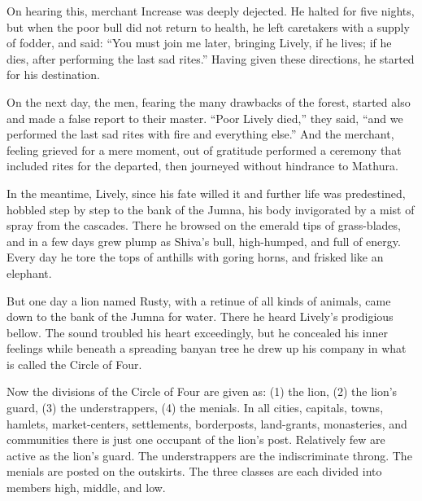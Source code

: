 \documentclass[article, twoside, 14pt]{memoir}
\begin{document}
On hearing this, merchant Increase was deeply dejected. He halted
for five nights, but when the poor bull did not return to health,
he left caretakers with a supply of fodder, and said:
``You must join me later, bringing Lively, if he lives; if he dies, after performing the last sad rites.''
Having given these directions, he started for his destination.

On the next day, the men, fearing the many drawbacks of the forest,
started also and made a false report to their master.
``Poor Lively died,'' they said,
``and we performed the last sad rites with fire and everything else.''
And the merchant, feeling grieved for a mere moment, out of
gratitude performed a ceremony that included rites for the
departed, then journeyed without hindrance to Mathura.

In the meantime, Lively, since his fate willed it and further life
was predestined, hobbled step by step to the bank of the Jumna, his
body invigorated by a mist of spray from the cascades. There he
browsed on the emerald tips of grass-blades, and in a few days grew
plump as Shiva's bull, high-humped, and full of energy. Every day
he tore the tops of anthills with goring horns, and frisked like an
elephant.

But one day a lion named Rusty, with a retinue of all kinds of
animals, came down to the bank of the Jumna for water. There he
heard Lively's prodigious bellow. The sound troubled his heart
exceedingly, but he concealed his inner feelings while beneath a
spreading banyan tree he drew up his company in what is called the
Circle of Four.

Now the divisions of the Circle of Four are given as: (1) the lion,
(2) the lion's guard, (3) the understrappers, (4) the menials. In
all cities, capitals, towns, hamlets, market-centers, settlements,
borderposts, land-grants, monasteries, and communities there is
just one occupant of the lion's post. Relatively few are active as
the lion's guard. The understrappers are the indiscriminate throng.
The menials are posted on the outskirts. The three classes are each
divided into members high, middle, and low.
\end{document}
